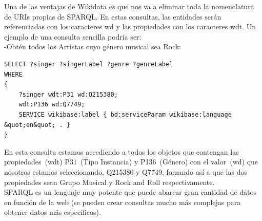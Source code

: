 Una de las ventajas de Wikidata es que nos va a eliminar toda la nomenclatura de URIs propias de SPARQL. En estas consultas, las entidades serán referenciadas con los caracteres wd y las propiedades con los caracteres wdt. Un ejemplo de una consulta sencilla podría ser:\\

-Obtén todos los Artistas cuyo género musical sea Rock:\\
\begin{lstlisting}[language=SPARQL]
SELECT ?singer ?singerLabel ?genre ?genreLabel
WHERE
{
	?singer wdt:P31 wd:Q215380;
	wdt:P136 wd:Q7749;
	SERVICE wikibase:label { bd:serviceParam wikibase:language &quot;en&quot; . }
}
\end{lstlisting}
\bigskip

En esta consulta estamos accediendo a todos los objetos que contengan las propiedades~(wdt) P31~(Tipo Instancia) y P136~(Género) con el valor~(wd) que nosotros estamos seleccionando, Q215380 y Q7749, forzando así a que las dos propiedades sean Grupo Musical y Rock and Roll respectivamente.\\

SPARQL es un lenguaje muy potente que puede abarcar gran cantidad de datos en función de la web (se pueden crear consultas mucho más complejas para obtener datos más específicos).
